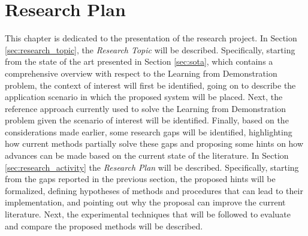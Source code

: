 \chapter{Research Plan}
\label{chapter:research_plan}
This chapter is dedicated to the presentation of the research project. In Section \ref{sec:research_topic}, the \textit{Research Topic} will be described. Specifically, starting from the state of the art presented in Section \ref{sec:sota}, which contains a comprehensive overview with respect to the Learning from Demonstration problem, the context of interest will first be identified, going on to describe the application scenario in which the proposed system will be placed. Next, the reference approach currently used to solve the Learning from Demonstration problem given the scenario of interest will be identified. Finally, based on the considerations made earlier, some research gaps will be identified, highlighting how current methods partially solve these gaps and proposing some hints on how advances can be made based on the current state of the literature.
In Section \ref{sec:research_activity} the \textit{Research Plan} will be described. Specifically, starting from the gaps reported in the previous section, the proposed hints will be formalized, defining hypotheses of methods and procedures that can lead to their implementation, and pointing out why the proposal can improve the current literature. Next, the experimental techniques that will be followed to evaluate and compare the proposed methods will be described.


